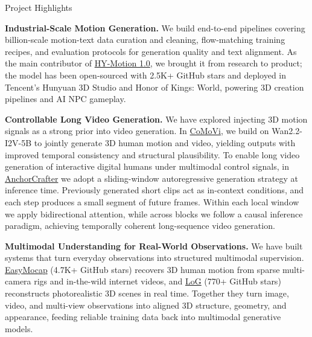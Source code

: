 \begin{rSection}{Project Highlights}

    {\bf Industrial-Scale Motion Generation.} We build end-to-end pipelines covering billion-scale motion-text data curation and cleaning, flow-matching training recipes, and evaluation protocols for generation quality and text alignment. As the main contributor of \href{https://github.com/Tencent-Hunyuan/HY-Motion-1.0}{HY-Motion 1.0}, we brought it from research to product; the model has been open-sourced with 2.5K+ GitHub stars and deployed in Tencent's Hunyuan 3D Studio and Honor of Kings: World, powering 3D creation pipelines and AI NPC gameplay.

    {\bf Controllable Long Video Generation.} We have explored injecting 3D motion signals as a strong prior into video generation. In \href{https://igl-hkust.github.io/CoMoVi/}{CoMoVi}, we build on Wan2.2-I2V-5B to jointly generate 3D human motion and video, yielding outputs with improved temporal consistency and structural plausibility. To enable long video generation of interactive digital humans under multimodal control signals, in \href{https://cangcz.github.io/AnchorCrafter/}{AnchorCrafter} we adopt a sliding-window autoregressive generation strategy at inference time. Previously generated short clips act as in-context conditions, and each step produces a small segment of future frames. Within each local window we apply bidirectional attention, while across blocks we follow a causal inference paradigm, achieving temporally coherent long-sequence video generation.

    {\bf Multimodal Understanding for Real-World Observations.} We have built systems that turn everyday observations into structured multimodal supervision. \href{https://github.com/zju3dv/EasyMocap}{EasyMocap} (4.7K+ GitHub stars) recovers 3D human motion from sparse multi-camera rigs and in-the-wild internet videos, and \href{https://github.com/zju3dv/LoG}{LoG} (770+ GitHub stars) reconstructs photorealistic 3D scenes in real time. Together they turn image, video, and multi-view observations into aligned 3D structure, geometry, and appearance, feeding reliable training data back into multimodal generative models.

\end{rSection}
